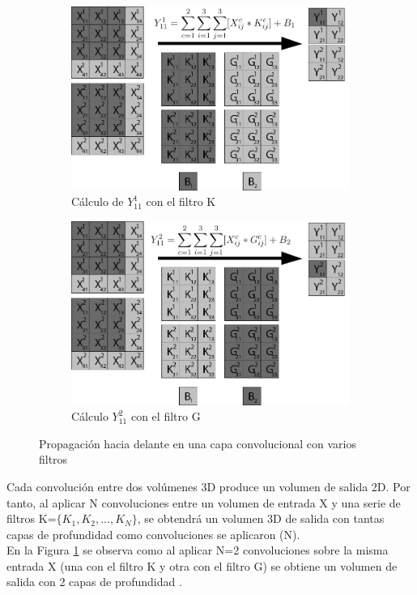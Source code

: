 \begin{figure}[H]
	\centering
	\begin{subfigure}{.5\textwidth}
		\hspace{-10mm}
		\includegraphics[width=1.2\linewidth]{imagenes/conv_2kernels_1.jpg}  
		\caption{Cálculo de $Y^1_{11}$ con el filtro K}
	\end{subfigure}%
	\begin{subfigure}{.5\textwidth}
		\hspace{10mm}
		\includegraphics[width=1.2\linewidth]{imagenes/conv_2kernels_2.jpg}  
		\caption{Cálculo $Y^2_{11}$ con el filtro G}
	\end{subfigure}
	\caption{Propagación hacia delante en una capa convolucional con varios filtros}
	\label{fig:forward_prop_convolucional_varios_kernels}
\end{figure}

Cada convolución entre dos volúmenes 3D produce un volumen de salida 2D. Por tanto, al aplicar N convoluciones entre un volumen de entrada X y una serie de filtros K=$\{K_1, K_2, ..., K_N\}$, se obtendrá un volumen 3D de salida con tantas capas de profundidad como convoluciones se aplicaron (N). \\
En la Figura \ref{fig:forward_prop_convolucional_varios_kernels} se observa como al aplicar N=2 convoluciones sobre la misma entrada X (una con el filtro K y otra con el filtro G) se obtiene un volumen de salida con 2 capas de profundidad \cite{capa_convolucional_Stanford}.

